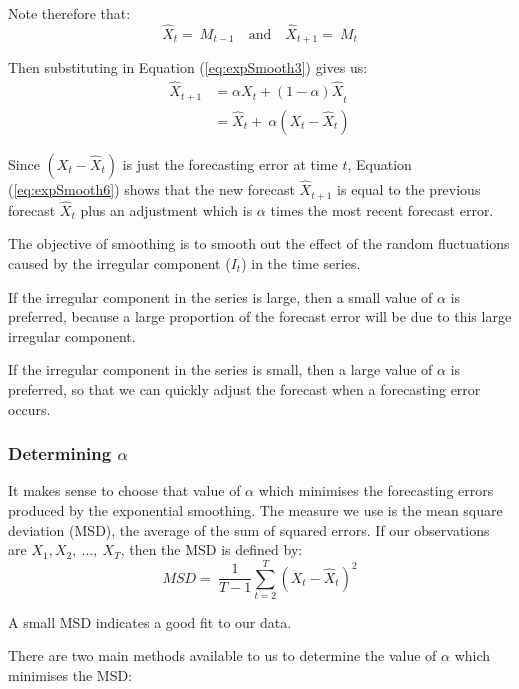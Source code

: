 \documentclass[12pt,a4paper,openany,twoside]{report}
\theoremstyle{definition}
\theoremstyle{remark}
\theoremstyle{plain}
\theoremstyle{definition}
\theoremstyle{definition}
\theoremstyle{definition}
\theoremstyle{remark}
\begin{document}
Note therefore that:
\[{\hat{X}}_{t} = \ M_{t - 1} \quad \mbox{and} \quad {\hat{X}}_{t + 1} = \ M_{t}\]

Then substituting in Equation (\ref{eq:expSmooth3}) gives us:
\begin{align}
{\hat{X}}_{t + 1} &  = {\alpha X_{t} + \left( 1 - \alpha \right)\hat{X}}_{t} \\
   & = {\hat{X}}_{t} + \ \alpha(X_{t} - {\hat{X}}_{t})
\label{eq:expSmooth6}
\end{align}

Since \((X_{t} - {\hat{X}}_{t})\) is just the forecasting error at time
\(t\), Equation (\ref{eq:expSmooth6}) shows that the new forecast \({\hat{X}}_{t + 1}\)
is equal to the previous forecast \({\hat{X}}_{t}\) plus an adjustment
which is \(\alpha\) times the most recent forecast error.

The objective of smoothing is to smooth out the effect of the random
fluctuations caused by the irregular component (\(I_{t}\)) in the time
series.

If the irregular component in the series is large, then a small value of
\(\alpha\) is preferred, because a large proportion of the forecast
error will be due to this large irregular component.

If the irregular component in the series is small, then a large value of
\(\alpha\) is preferred, so that we can quickly adjust the forecast when
a forecasting error occurs.

\hypertarget{determining-alpha}{%
\subsubsection*{\texorpdfstring{Determining \(\alpha\)}{Determining \textbackslash{}alpha}}\label{determining-alpha}}

It makes sense to choose that value of \(\alpha\) which minimises the
forecasting errors produced by the exponential smoothing. The measure we
use is the mean square deviation (MSD), the average of the sum of
squared errors. If our observations are
\(X_{1},X_{2},\ \ldots,\ X_{T}\), then the MSD is defined by:
\[MSD = \ \frac{1}{T - 1}\sum_{t = 2}^{T}{(X_{t} - {\hat{X}}_{t})}^{2}\]

A small MSD indicates a good fit to our data.

\newpage

There are two main methods available to us to determine the value of
\(\alpha\) which minimises the MSD:
\end{document}
